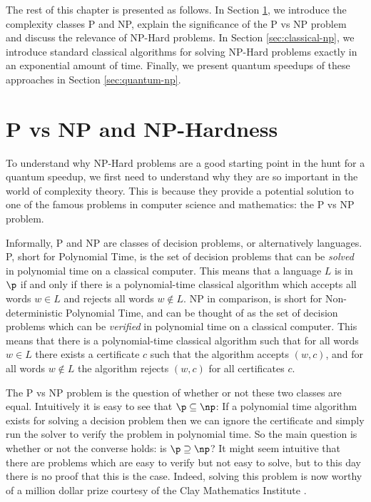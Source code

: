 The rest of this chapter is presented as follows. In Section \ref{sec:p-vs-np}, we introduce the complexity classes P and NP, explain the significance of the P vs NP problem and discuss the relevance of NP-Hard problems. In Section \ref{sec:classical-np}, we introduce standard classical algorithms for solving NP-Hard problems exactly in an exponential amount of time. Finally, we present quantum speedups of these approaches in Section \ref{sec:quantum-np}.

\section{P vs NP and NP-Hardness}
\label{sec:p-vs-np}

To understand why NP-Hard problems are a good starting point in the hunt for a quantum speedup, we first need to understand why they are so important in the world of complexity theory. This is because they provide a potential solution to one of the famous problems in computer science and mathematics: the P vs NP problem.

Informally, P and NP are classes of decision problems, or alternatively languages. P, short for Polynomial Time, is the set of decision problems that can be \textit{solved} in polynomial time on a classical computer. This means that a language $L $ is in $ \p$ if and only if there is a polynomial-time classical algorithm which accepts all words $w \in L$ and rejects all words $w \notin L$. NP in comparison, is short for Non-deterministic Polynomial Time, and can be thought of as the set of decision problems which can be \textit{verified} in polynomial time on a classical computer. This means that there is a polynomial-time classical algorithm such that for all words $w \in L$ there exists a certificate $c$ such that the algorithm accepts $(w,c)$, and for all words $w \notin L$ the algorithm rejects $(w,c)$ for all certificates $c$.

The P vs NP problem is the question of whether or not these two classes are equal. Intuitively it is easy to see that $\p \subseteq \np$: If a polynomial time algorithm exists for solving a decision problem then we can ignore the certificate and simply run the solver to verify the problem in polynomial time. So the main question is whether or not the converse holds: is $\p \supseteq \np$? It might seem intuitive that there are problems which are easy to verify but not easy to solve, but to this day there is no proof that this is the case. Indeed, solving this problem is now worthy of a million dollar prize courtesy of the Clay Mathematics Institute \cite{cmipvsnp}.

